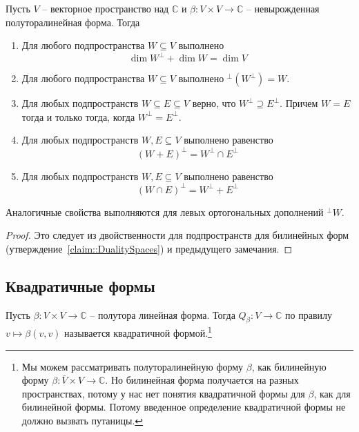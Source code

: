 \begin{claim}
Пусть $V$ -- векторное пространство над $\mathbb C$ и $\beta \colon V\times V\to \mathbb C$ -- невырожденная полуторалинейная форма. Тогда
\begin{enumerate}
\item Для любого подпространства $W\subseteq V$ выполнено
\[
\dim W^\bot + \dim W = \dim V
\]
\item Для любого подпространства $W\subseteq V$ выполнено ${}^\bot(W^\bot) = W$.
\item Для любых подпространств $W\subseteq E\subseteq V$ верно, что $W^\bot \supseteq E^\bot$. Причем $W = E$ тогда и только тогда, когда $W^\bot = E^\bot$.
\item Для любых подпространств $W, E\subseteq V$ выполнено равенство
\[
(W + E)^\bot = W^\bot \cap E^\bot
\]
\item Для любых подпространств $W, E\subseteq V$ выполнено равенство
\[
(W\cap E)^\bot = W^\bot + E^\bot
\]
\end{enumerate}
Аналогичные свойства выполняются для левых ортогональных дополнений ${}^\bot W$.
\end{claim}
\begin{proof}
Это следует из двойственности для подпространств для билинейных форм (утверждение~\ref{claim::DualitySpaces}) и предыдущего замечания.
\end{proof}

\subsection{Квадратичные формы}


\begin{definition}
Пусть $\beta\colon V\times V\to \mathbb C$ -- полутора линейная форма. Тогда $Q_\beta\colon V\to \mathbb C$ по правилу $v\mapsto \beta(v,v)$ называется квадратичной формой.\footnote{Мы можем рассматривать полуторалинейную форму $\beta$, как билинейную форму $\beta\colon \bar V\times V\to \mathbb C$. Но билинейная форма получается на разных пространствах, потому у нас нет понятия квадратичной формы для $\beta$, как для билинейной формы. Потому введенное определение квадратичной формы не должно вызвать путаницы.}
\end{definition}

